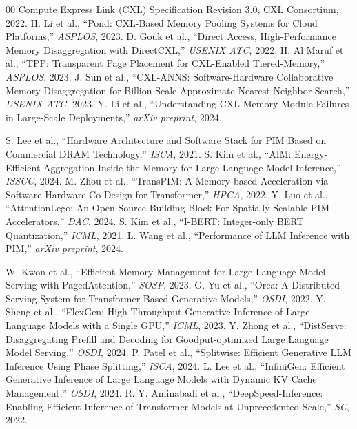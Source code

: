 \documentclass[10pt,conference]{IEEEtran}
\begin{document}
\begin{thebibliography}{00}
 Compute Express Link (CXL) Specification Revision 3.0, CXL Consortium, 2022.
 H. Li et al., ``Pond: CXL-Based Memory Pooling Systems for Cloud Platforms,'' \textit{ASPLOS}, 2023.
 D. Gouk et al., ``Direct Access, High-Performance Memory Disaggregation with DirectCXL,'' \textit{USENIX ATC}, 2022.
 H. Al Maruf et al., ``TPP: Transparent Page Placement for CXL-Enabled Tiered-Memory,'' \textit{ASPLOS}, 2023.
 J. Sun et al., ``CXL-ANNS: Software-Hardware Collaborative Memory Disaggregation for Billion-Scale Approximate Nearest Neighbor Search,'' \textit{USENIX ATC}, 2023.
 Y. Li et al., ``Understanding CXL Memory Module Failures in Large-Scale Deployments,'' \textit{arXiv preprint}, 2024.

 S. Lee et al., ``Hardware Architecture and Software Stack for PIM Based on Commercial DRAM Technology,'' \textit{ISCA}, 2021.
 S. Kim et al., ``AIM: Energy-Efficient Aggregation Inside the Memory for Large Language Model Inference,'' \textit{ISSCC}, 2024.
 M. Zhou et al., ``TransPIM: A Memory-based Acceleration via Software-Hardware Co-Design for Transformer,'' \textit{HPCA}, 2022.
 Y. Luo et al., ``AttentionLego: An Open-Source Building Block For Spatially-Scalable PIM Accelerators,'' \textit{DAC}, 2024.
 S. Kim et al., ``I-BERT: Integer-only BERT Quantization,'' \textit{ICML}, 2021.
 L. Wang et al., ``Performance of LLM Inference with PIM,'' \textit{arXiv preprint}, 2024.

 W. Kwon et al., ``Efficient Memory Management for Large Language Model Serving with PagedAttention,'' \textit{SOSP}, 2023.
 G. Yu et al., ``Orca: A Distributed Serving System for Transformer-Based Generative Models,'' \textit{OSDI}, 2022.
 Y. Sheng et al., ``FlexGen: High-Throughput Generative Inference of Large Language Models with a Single GPU,'' \textit{ICML}, 2023.
 Y. Zhong et al., ``DistServe: Disaggregating Prefill and Decoding for Goodput-optimized Large Language Model Serving,'' \textit{OSDI}, 2024.
 P. Patel et al., ``Splitwise: Efficient Generative LLM Inference Using Phase Splitting,'' \textit{ISCA}, 2024.
 L. Lee et al., ``InfiniGen: Efficient Generative Inference of Large Language Models with Dynamic KV Cache Management,'' \textit{OSDI}, 2024.
 R. Y. Aminabadi et al., ``DeepSpeed-Inference: Enabling Efficient Inference of Transformer Models at Unprecedented Scale,'' \textit{SC}, 2022.


\end{thebibliography}
\end{document}
